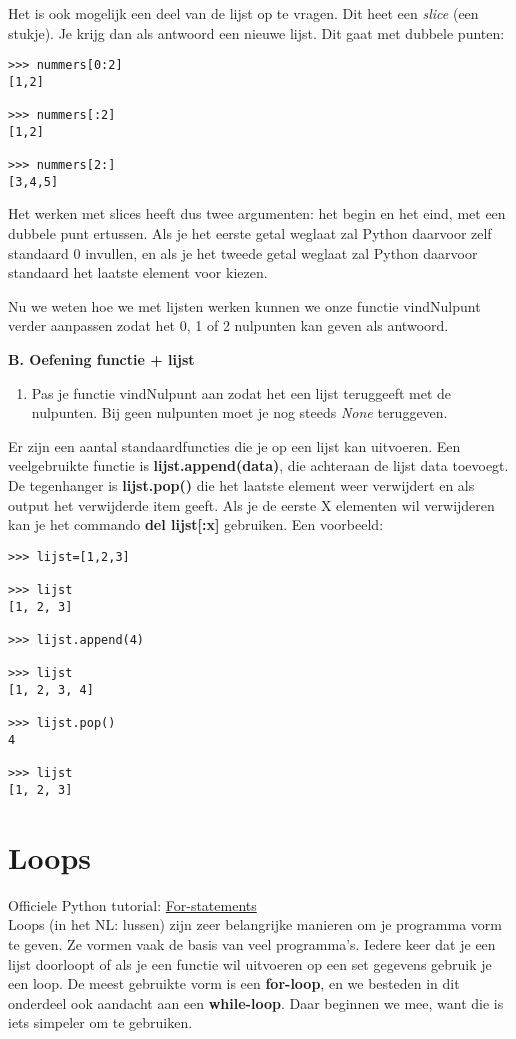 Het is ook mogelijk een deel van de lijst op te vragen. Dit heet een \textit{slice} (een stukje). Je krijg dan als antwoord een nieuwe lijst. Dit gaat met dubbele punten:

\begin{lstlisting}[frame=single]
>>> nummers[0:2]
[1,2]

>>> nummers[:2]
[1,2]

>>> nummers[2:]
[3,4,5]
\end{lstlisting}

Het werken met slices heeft dus twee argumenten: het begin en het eind, met een dubbele punt ertussen. Als je het eerste getal weglaat zal Python daarvoor zelf standaard 0 invullen, en als je het tweede getal weglaat zal Python daarvoor standaard het laatste element voor kiezen. 

Nu we weten hoe we met lijsten werken kunnen we onze functie vindNulpunt verder aanpassen zodat het 0, 1 of 2 nulpunten kan geven als antwoord.

\textbf{B. Oefening functie + lijst}
\begin{enumerate}[label=\textbf{B.\arabic*}]
\item Pas je functie vindNulpunt aan zodat het een lijst teruggeeft met de nulpunten. Bij geen nulpunten moet je nog steeds \textit{None} teruggeven.
\end{enumerate}

Er zijn een aantal standaardfuncties die je op een lijst kan uitvoeren. Een veelgebruikte functie is \textbf{lijst.append(data)}, die achteraan de lijst data toevoegt. De tegenhanger is \textbf{lijst.pop()} die het laatste element weer verwijdert en als output het verwijderde item geeft. Als je de eerste X elementen wil verwijderen kan je het commando \textbf{del lijst[:x]} gebruiken. 
Een voorbeeld:

\begin{lstlisting}[frame=single]
>>> lijst=[1,2,3]

>>> lijst
[1, 2, 3]

>>> lijst.append(4)

>>> lijst
[1, 2, 3, 4]

>>> lijst.pop()
4

>>> lijst
[1, 2, 3]
\end{lstlisting}

\section{Loops}
Officiele Python tutorial: \href{https://docs.python.org/3/tutorial/controlflow.html\#for-statements}{For-statements}\\
Loops (in het NL: lussen) zijn zeer belangrijke manieren om je programma vorm te geven. Ze vormen vaak de basis van veel programma's. Iedere keer dat je een lijst doorloopt of als je een functie wil uitvoeren op een set gegevens gebruik je een loop. De meest gebruikte vorm is een \textbf{for-loop}, en we besteden in dit onderdeel ook aandacht aan een \textbf{while-loop}. Daar beginnen we mee, want die is iets simpeler om te gebruiken.

